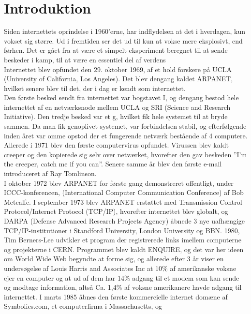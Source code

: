 \newpage
\chapter{Introduktion}
 
    Siden internettets oprindelse i 1960’erne, har indflydelsen at det i hverdagen, kun vokset sig større. Ud i fremtiden ser det ud til kun at vokse mere eksplosivt, end førhen. Det er gået fra at være et simpelt eksperiment beregnet til at sende beskeder i kamp, til at være en essentiel del af verdens \\
    Internettet blev opfundet den 29. oktober 1969, af et hold forskere på UCLA (University of California, Los Angeles). Det blev dengang kaldet ARPANET, hvilket senere blev til det, der i dag er kendt som internettet.\\
    Den første besked sendt fra internettet var bogstavet I, og dengang bestod hele internettet af en netværksnode mellem UCLA og SRI (Science and Research Initiative). 
    Den tredje besked var et g, hvilket fik hele systemet til at bryde sammen. Da man fik genoplivet systemet, var forbindelsen stabil, og efterfølgende inden året var omme opstod der et fungerende netværk bestående af 4 computere.
    Allerede i 1971 blev den første computervirus opfundet. Virussen blev kaldt creeper og den kopierede sig selv over netværket, hvorefter den gav beskeden ”I’m the creeper, catch me if you can”. Senere samme år blev den første e-mail introduceret af Ray Tomlinson.\\
    I oktober 1972 blev ARPANET for første gang demonstreret offentligt, under ICCC-konferencen, (International Computer Communication Conference) af Bob Metcalfe. I september 1973 blev ARPANET erstattet med Transmission Control Protocol/Internet Protocol (TCP/IP), hvorefter internettet blev globalt, og DARPA (Defense Advanced Research Projects Agency) åbnede 3 nye uafhængige TCP/IP-institutioner i Standford University, London University og BBN.
    1980, Tim Berners-Lee udvikler et program der registrerede links imellem computerne og projekterne i CERN. 
    Programmet blev kaldt ENQUIRE, og det var her ideen om World Wide Web begyndte at forme sig, og allerede efter 3 år viser en undersøgelse af Louis Harris and Associates Inc at 10\% af amerikanske voksne ejer en computer og at ud af dem har 14\% adgang til et modem som kan sende og modtage information, altså Ca. 1,4\% af voksne amerikanere havde adgang til internettet. 
    I marts 1985 åbnes den første kommercielle internet domæne af Symbolics.com, et computerfirma i Massachusetts, og
